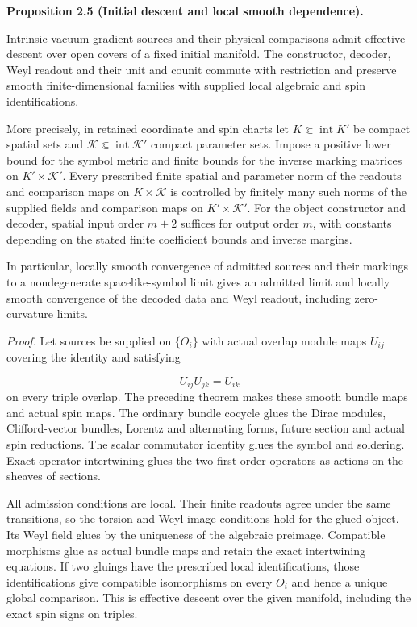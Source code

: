\documentclass[
  english,
  11pt,
  reqno]{amsart}
\makeatletter
\newcommand{\pandocstatementheading}[1]{%
  \par\addpenalty{\@beginparpenalty}%
  \addvspace{.5\baselineskip plus .2\baselineskip minus .2\baselineskip}%
  {\normalfont\bfseries #1\par}%
  \nobreak\@afterindenttrue\@afterheading
}
\makeatother
\begin{document}
\pandocstatementheading{\leavevmode{}\label{prop:online-initial-gradient-descent-families}Proposition 2.5 (Initial descent and local smooth dependence).}

Intrinsic vacuum gradient sources and their physical comparisons admit
effective descent over open covers of a fixed initial manifold. The
constructor, decoder, Weyl readout and their unit and counit commute
with restriction and preserve smooth finite-dimensional families with
supplied local algebraic and spin identifications.

More precisely, in retained coordinate and spin charts let
\(K\Subset\operatorname{int}K'\) be compact spatial sets and
\(\mathcal K\Subset\operatorname{int}\mathcal K'\) compact parameter
sets. Impose a positive lower bound for the symbol metric and finite
bounds for the inverse marking matrices on \(K'\times\mathcal K'\).
Every prescribed finite spatial and parameter norm of the readouts and
comparison maps on \(K\times\mathcal K\) is controlled by finitely many
such norms of the supplied fields and comparison maps on
\(K'\times\mathcal K'\). For the object constructor and decoder, spatial
input order \(m+2\) suffices for output order \(m\), with constants
depending on the stated finite coefficient bounds and inverse margins.

In particular, locally smooth convergence of admitted sources and their
markings to a nondegenerate spacelike-symbol limit gives an admitted
limit and locally smooth convergence of the decoded data and Weyl
readout, including zero-curvature limits.

\emph{Proof.} Let sources be supplied on \(\{O_i\}\) with actual overlap
module maps \(U_{ij}\) covering the identity and satisfying

\label{eq:online-initial-actual-spin-cocycle} \[
U_{ij}U_{jk}=U_{ik}
\] on every triple overlap. The preceding theorem makes these smooth
bundle maps and actual spin maps. The ordinary bundle cocycle glues the
Dirac modules, Clifford-vector bundles, Lorentz and alternating forms,
future section and actual spin reductions. The scalar commutator
identity glues the symbol and soldering. Exact operator intertwining
glues the two first-order operators as actions on the sheaves of
sections.

All admission conditions are local. Their finite readouts agree under
the same transitions, so the torsion and Weyl-image conditions hold for
the glued object. Its Weyl field glues by the uniqueness of the
algebraic preimage. Compatible morphisms glue as actual bundle maps and
retain the exact intertwining equations. If two gluings have the
prescribed local identifications, those identifications give compatible
isomorphisms on every \(O_i\) and hence a unique global comparison. This
is effective descent over the given manifold, including the exact spin
signs on triples.
\end{document}
